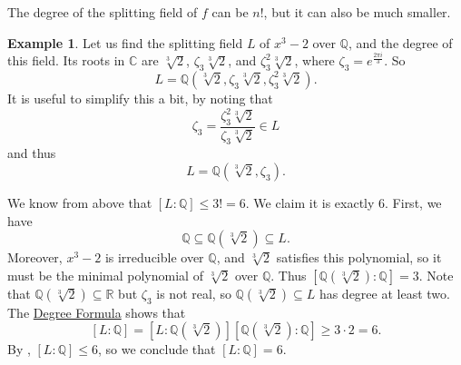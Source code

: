 \documentclass[12pt]{report}
\numberwithin{equation}{section}
\numberwithin{theorem}{chapter}
\theoremstyle{definition}
\newtheorem{example}[theorem]{Example}
\newtheorem*{basic properties}{Basic Properties}
\newtheorem*{Important Remark}{Important Remark}
\newcommand{\C}{\mathbb{C}}
\begin{document}
The degree of the splitting field of $f$ can be $n!$, but it can also be much smaller.

\begin{example}\label{example splitting field x3-2}
Let us find the splitting field $L$ of $x^3 -2$ over $\mathbb{Q}$, and the degree of this field.
Its roots in $\C$ are $\sqrt[3]{2}$, $\zeta_3 \sqrt[3]{2}$, and $\zeta_3^2 \sqrt[3]{2}$, where $\zeta_3 = e^{\frac{2 \pi i}{3}}$.
So
$$L = \mathbb{Q}(\sqrt[3]{2}, \zeta_3 \sqrt[3]{2}, \zeta_3^2 \sqrt[3]{2}).$$
It is useful to simplify this a bit, by noting that 
$$\zeta_3 = \frac{\zeta_3^2 \sqrt[3]{2}}{\zeta_3 \sqrt[3]{2}} \in L$$
and thus
$$L = \mathbb{Q}(\sqrt[3]{2}, \zeta_3).$$

We know from  above that $[L: \mathbb{Q}] \leqslant 3! = 6$. We claim it is exactly $6$. First, we have
$$\mathbb{Q} \subseteq \mathbb{Q}(\sqrt[3]{2}) \subseteq L.$$
Moreover, $x^3 - 2$ is irreducible over $\mathbb{Q}$, and $\sqrt[3]{2}$ satisfies this polynomial, so it must be the minimal polynomial of $\sqrt[3]{2}$ over $\mathbb{Q}$. Thus $[\mathbb{Q}(\sqrt[3]{2}): \mathbb{Q}] = 3$.
Note that $\mathbb{Q}(\sqrt[3]{2}) \subseteq \mathbb{R}$ but $\zeta_3$ is not real, so $\mathbb{Q}(\sqrt[3]{2}) \subseteq L$ has degree at least two. The \hyperref[deg formula]{Degree Formula} shows that 
$$[L:\mathbb{Q}] =  [L : \mathbb{Q}(\sqrt[3]{2})] [\mathbb{Q}(\sqrt[3]{2}): \mathbb{Q}] \geqslant 3 \cdot 2= 6.$$
By , $[L:\mathbb{Q}] \leqslant 6$, so we conclude that $[L:\mathbb{Q}] = 6$.

\end{example}
\end{document}
